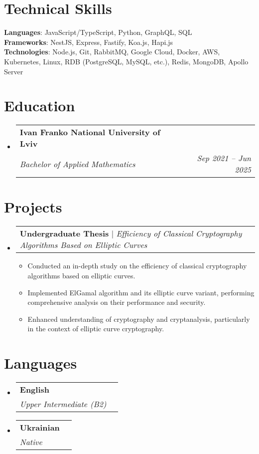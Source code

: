 \documentclass[letterpaper,11pt]{article}
\makeatletter
\newcommand{\resumeItem}[1]{
  \item\small{
    {#1 \vspace{-2pt}}
  }
}
\newcommand{\resumeSubheading}[4]{
  \vspace{-2pt}\item
    \begin{tabular*}{0.97\textwidth}[t]{l@{\extracolsep{\fill}}r}
      \textbf{#1} & #2 \\
      \textit{\small#3} & \textit{\small #4} \\
    \end{tabular*}\vspace{-7pt}
}
\newcommand{\resumeSubHeadingListStart}{\begin{itemize}[leftmargin=0.15in, label={}]}
\newcommand{\resumeSubHeadingListEnd}{\end{itemize}}
\newcommand{\resumeItemListStart}{\begin{itemize}}
\newcommand{\resumeItemListEnd}{\end{itemize}\vspace{-5pt}}
\newcommand{\resumeProjectHeading}[2]{
    \item
    \begin{tabular*}{0.97\textwidth}{l@{\extracolsep{\fill}}r}
      \small#1 & #2 \\
    \end{tabular*}\vspace{5pt}  %
}
\makeatother
\begin{document}
\section{Technical Skills}
 \begin{itemize}[leftmargin=0.15in, label={}]
    \small{\item{
     \textbf{Languages}{: JavaScript/TypeScript, Python, GraphQL, SQL} \\
     \textbf{Frameworks}{: NestJS, Express, Fastify, Koa.js, Hapi.js} \\
     \textbf{Technologies}{: Node.js, Git, RabbitMQ, Google Cloud, Docker, AWS, Kubernetes, Linux, RDB (PostgreSQL, MySQL, etc.), Redis, MongoDB, Apollo Server} \\
    }}
 \end{itemize}
 
\section{Education}
  \resumeSubHeadingListStart
    \resumeSubheading
      {Ivan Franko National University of Lviv}{}
      {Bachelor of Applied Mathematics} {Sep 2021 -- Jun 2025}
  \resumeSubHeadingListEnd

\section{Projects}
    \resumeSubHeadingListStart
      \resumeProjectHeading
          {\textbf{Undergraduate Thesis} $|$ \emph{Efficiency of Classical Cryptography Algorithms Based on Elliptic Curves}}{}
          \resumeItemListStart
            \resumeItem{Conducted an in-depth study on the efficiency of classical cryptography algorithms based on elliptic curves.}
            \resumeItem{Implemented ElGamal algorithm and its elliptic curve variant, performing comprehensive analysis on their performance and security.}
            \resumeItem{Enhanced understanding of cryptography and cryptanalysis, particularly in the context of elliptic curve cryptography.}
          \resumeItemListEnd
    \resumeSubHeadingListEnd
    
\section{Languages}
  \resumeSubHeadingListStart
    \resumeSubheading
      {English}{}
      {Upper Intermediate (B2)} {}
    \resumeSubheading
      {Ukrainian}{}
      {Native} {}
  \resumeSubHeadingListEnd
  
\end{document}
